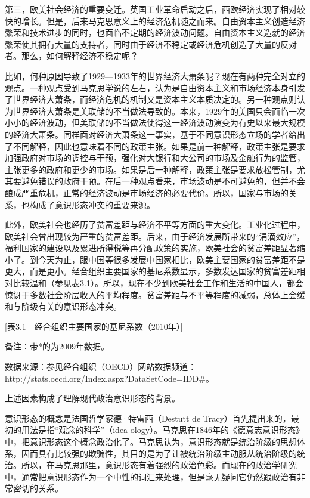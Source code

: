 第三，欧美社会经济的重要变迁。英国工业革命启动之后，西欧经济实现了相对较快的增长。但是，后来马克思意义上的经济危机随之而来。自由资本主义创造经济繁荣和技术进步的同时，也面临不定期的经济波动问题。自由资本主义造就的经济繁荣使其拥有大量的支持者，同时由于经济不稳定或经济危机创造了大量的反对者。那么，如何解释经济不稳定呢？

比如，何种原因导致了1929—1933年的世界经济大萧条呢？现在有两种完全对立的观点。一种观点受到马克思学说的左右，认为是自由资本主义和市场经济本身引发了世界经济大萧条，而经济危机的机制又是资本主义本质决定的。另一种观点则认为世界经济大萧条是美联储的不当做法导致的。本来，1929年的美国只会面临一次小小的经济波动，但美联储的不当做法使得这一经济波动演变为有史以来最大规模的经济大萧条。同样面对经济大萧条这一事实，基于不同意识形态立场的学者给出了不同解释，因此也意味着不同的政策主张。如果是前一种解释，政策主张是要求加强政府对市场的调控与干预，强化对大银行和大公司的市场及金融行为的监管，主张更多的政府和更少的市场。如果是后一种解释，政策主张是要求放松管制，尤其要避免错误的政府干预。在后一种观点看来，市场波动是不可避免的，但并不会酿成严重危机，正常的经济波动是市场经济的必要代价。所以，国家与市场的关系，也构成了意识形态冲突的重要来源。

此外，欧美社会也经历了贫富差距与经济不平等方面的重大变化。工业化过程中，欧美社会曾出现较为严重的贫富差距。后来，由于经济发展所带来的“涓滴效应”，福利国家的建设以及累进所得税等再分配政策的实施，欧美社会的贫富差距显著缩小了。到今天为止，跟中国等很多发展中国家相比，欧美主要国家的贫富差距不是更大，而是更小。经合组织主要国家的基尼系数显示，多数发达国家的贫富差距相对比较温和（参见表3.1）。所以，现在不少到欧美社会工作和生活的中国人，都会惊讶于多数社会阶层收入的平均程度。贫富差距与不平等程度的减弱，总体上会缓和与阶级有关的意识形态冲突。

[表3.1　经合组织主要国家的基尼系数（2010年）]

备注：带*的为2009年数据。

数据来源：参见经合组织（OECD）网站数据频道：http://stats.oecd.org/Index.aspx?DataSetCode=IDD\#。

上述因素构成了理解现代政治意识形态的背景。

意识形态的概念是法国哲学家德·特雷西（Destutt de Tracy）首先提出来的，最初的用法是指“观念的科学”（idea-ology）。马克思在1846年的《德意志意识形态》中，把意识形态这个概念政治化了。马克思认为，意识形态就是统治阶级的思想体系，因而具有比较强的欺骗性，其目的是为了让被统治阶级主动服从统治阶级的统治。所以，在马克思那里，意识形态有着强烈的政治色彩。而现在的政治学研究中，通常把意识形态作为一个中性的词汇来处理，但是毫无疑问它仍然跟政治有非常密切的关系。

